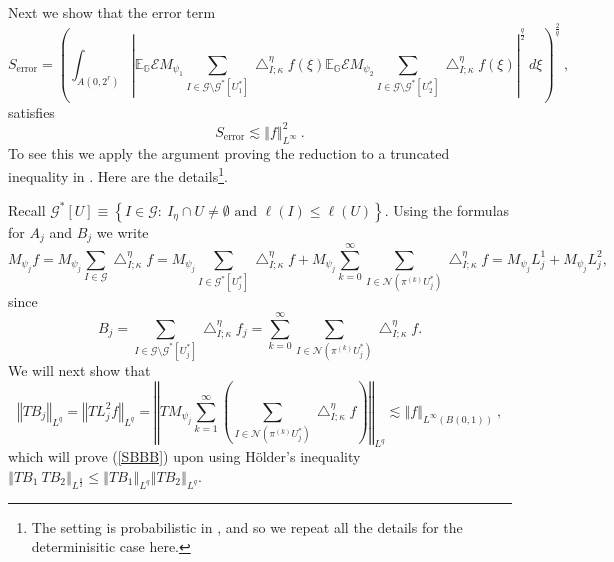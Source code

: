 \documentclass{amsart}%
\theoremstyle{plain}
\numberwithin{equation}{section}
\begin{document}
Next we show that the error term%
\[
S_{\operatorname*{error}}=\left(  \int_{A\left(  0,2^{r}\right)  }\left\vert
\mathbb{E}_{\mathbb{G}}\mathcal{E}M_{\psi_{1}}\sum_{I\in\mathcal{G\setminus
G}^{\ast}\left[  U_{1}^{\ast}\right]  }\bigtriangleup_{I;\kappa}^{\eta
}f\left(  \xi\right)  \mathbb{E}_{\mathbb{G}}\mathcal{E}M_{\psi_{2}}\sum
_{I\in\mathcal{G\setminus G}^{\ast}\left[  U_{2}^{\ast}\right]  }%
\bigtriangleup_{I;\kappa}^{\eta}f\left(  \xi\right)  \right\vert ^{\frac{q}%
{2}}\ d\xi\right)  ^{\frac{2}{q}}\ ,
\]
satisfies%
\begin{equation}
S_{\operatorname*{error}}\lesssim\left\Vert f\right\Vert _{L^{\infty}}%
^{2}\ .\label{SBBB}%
\end{equation}
To see this we apply the argument proving the reduction to a truncated
inequality in \cite[Subsubsection 1.4.1]{Saw7}. Here are the
details\footnote{The setting is probabilistic in \cite[Subsubsection
1.4.1]{Saw7}, and so we repeat all the details for the determinisitic case
here.}.

Recall $\mathcal{G}^{\ast}\left[  U\right]  \equiv\left\{  I\in\mathcal{G}%
:\ I_{\eta}\cap U\neq\emptyset\text{ and }\ell\left(  I\right)  \leq
\ell\left(  U\right)  \right\}  $. Using the formulas for $A_{j}$ and $B_{j}$
we write%
\[
M_{\psi_{j}}f=M_{\psi_{j}}\sum_{I\in\mathcal{G}}\bigtriangleup_{I;\kappa
}^{\eta}f=M_{\psi_{j}}\sum_{I\in\mathcal{G}^{\ast}\left[  U_{j}^{\ast}\right]
}\bigtriangleup_{I;\kappa}^{\eta}f+M_{\psi_{j}}\sum_{k=0}^{\infty}\sum
_{I\in\mathcal{N}\left(  \pi^{\left(  k\right)  }U_{j}^{\ast}\right)
}\bigtriangleup_{I;\kappa}^{\eta}f=M_{\psi_{j}}L_{j}^{1}+M_{\psi_{j}}L_{j}%
^{2},
\]
since
\[
B_{j}=\sum_{I\in\mathcal{G\setminus G}^{\ast}\left[  U_{j}^{\ast}\right]
}\bigtriangleup_{I;\kappa}^{\eta}f_{j}=\sum_{k=0}^{\infty}\sum_{I\in
\mathcal{N}\left(  \pi^{\left(  k\right)  }U_{j}^{\ast}\right)  }%
\bigtriangleup_{I;\kappa}^{\eta}f.
\]
We will next show that%
\begin{equation}
\left\Vert TB_{j}\right\Vert _{L^{q}}=\left\Vert TL_{j}^{2}f\right\Vert
_{L^{q}}=\left\Vert TM_{\psi_{j}}\sum_{k=1}^{\infty}\left(  \sum
_{I\in\mathcal{N}\left(  \pi^{\left(  k\right)  }U_{j}^{\ast}\right)
}\bigtriangleup_{I;\kappa}^{\eta}f\right)  \right\Vert _{L^{q}}\lesssim
\left\Vert f\right\Vert _{L^{\infty}\left(  B\left(  0,1\right)  \right)
}\ ,\label{two ineq}%
\end{equation}
which will prove (\ref{SBBB}) upon using H\"{o}lder's inequality $\left\Vert
TB_{1}\ TB_{2}\right\Vert _{L^{\frac{q}{2}}}\leq\left\Vert TB_{1}\right\Vert
_{L^{q}}\left\Vert TB_{2}\right\Vert _{L^{q}}$.
\end{document}

